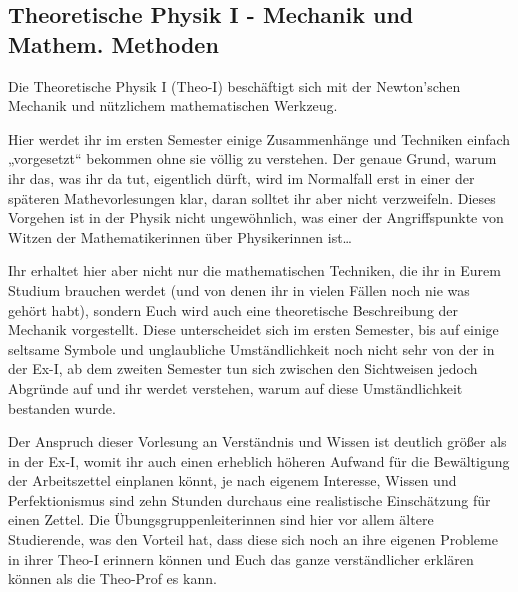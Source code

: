 \subsection{Theoretische Physik I - Mechanik und Mathem. Methoden}
\label{theo1}

Die Theoretische Physik I (Theo-I) beschäftigt sich mit der Newton'schen Mechanik und nützlichem mathematischen Werkzeug.

Hier werdet ihr im ersten Semester einige Zusammenhänge und Techniken einfach „vorgesetzt“ bekommen ohne sie völlig zu verstehen. Der genaue Grund, warum ihr das, was ihr da tut, eigentlich dürft, wird im Normalfall erst in einer der späteren Mathevorlesungen klar, daran solltet ihr aber nicht verzweifeln. Dieses Vorgehen ist in der Physik nicht ungewöhnlich, was einer der Angriffspunkte von Witzen der Mathematikerinnen über Physikerinnen ist\dots

Ihr erhaltet hier aber nicht nur die mathematischen Techniken, die ihr in Eurem Studium brauchen werdet (und von denen ihr in vielen Fällen noch nie was gehört habt), sondern Euch wird auch eine theoretische Beschreibung der Mechanik vorgestellt. Diese unterscheidet sich im ersten Semester, bis auf einige seltsame Symbole und unglaubliche Umständlichkeit noch nicht sehr von der in der Ex-I, ab dem zweiten Semester tun sich zwischen den Sichtweisen jedoch Abgründe auf und ihr werdet verstehen, warum auf diese Umständlichkeit bestanden wurde.

Der Anspruch dieser Vorlesung an Verständnis und Wissen ist deutlich größer als in der Ex-I, womit ihr auch einen erheblich höheren Aufwand für die Bewältigung der Arbeitszettel einplanen könnt, je nach eigenem Interesse, Wissen und Perfektionismus sind zehn Stunden durchaus eine realistische Einschätzung für einen Zettel. Die Übungsgruppenleiterinnen sind hier vor allem ältere Studierende, was den Vorteil hat, dass diese sich noch an ihre eigenen Probleme in ihrer Theo-I erinnern können und Euch das ganze verständlicher erklären können als die Theo-Prof es kann.


\vfill
\begin{figure}[hbt]
\end{figure}

